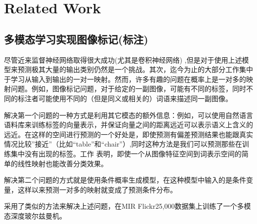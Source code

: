 \documentclass{article} %
\begin{document}
\section{Related Work}

\subsection{多模态学习实现图像标记(标注)}

尽管近来监督神经网络取得很大成功(尤其是卷积神经网络) \cite{Krizhevsky-2012, szegedy2014going},但是对于使用上述模型来预测极其大量的输出类别仍然是一个挑战。其次，迄今为止的大部分工作集中于学习从输入到输出的一对一映射。然而，许多有趣的问题在概率上是一对多的映射问题。例如，图像标记问题，对于给定的一副图像，可能有不同的标签，同时不同的标注者可能使用不同的（但是同义或相关的）词语来描述同一副图像。

解决第一个问题的一种方式是利用其它模态的额外信息：例如，可以使用自然语言语料库来训练标签的向量表示，并保证向量之间的距离远近可以表示语义上含义的远近。在这样的空间进行预测的一个好处是，即使预测有偏差预测结果也能跟真实情况比较”接近”（比如“table”和“chair”）,同时这种方法是我们可以预测那些在训练集中没有出现的标签。工作 \cite{frome2013devise} 表明，即使一个从图像特征空间到词表示空间的简单的线性映射也能改善分类效果。

解决第二个问题的方式就是使用条件概率生成模型，在这种模型中输入的是条件变量，这样以来预测一对多的映射就变成了预测条件分布。


\cite{Srivastava+Salakhutdinov-NIPS2012-small}采用了类似的方法来解决上述问题，在MIR Flickr25,000数据集上训练了一个多模态深度玻尔兹曼机。
\end{document}
